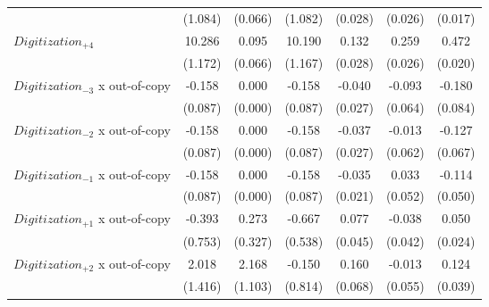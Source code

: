{\begin{tabular*}{\hsize}{@{\hskip\tabcolsep\extracolsep\fill}l*{6}{c}}
            &     (1.084)\sym{***}&     (0.066)         &     (1.082)\sym{***}&     (0.028)\sym{***}&     (0.026)\sym{***}&     (0.017)\sym{***}\\
\addlinespace
$Digitization_{+4}$&      10.286         &       0.095         &      10.190         &       0.132         &       0.259         &       0.472         \\
            &     (1.172)\sym{***}&     (0.066)         &     (1.167)\sym{***}&     (0.028)\sym{***}&     (0.026)\sym{***}&     (0.020)\sym{***}\\
\addlinespace
$Digitization_{-3}$ x out-of-copy&      -0.158         &       0.000         &      -0.158         &      -0.040         &      -0.093         &      -0.180         \\
            &     (0.087)\sym{*}  &     (0.000)         &     (0.087)\sym{*}  &     (0.027)\sym{+}  &     (0.064)\sym{+}  &     (0.084)\sym{**} \\
\addlinespace
$Digitization_{-2}$ x out-of-copy&      -0.158         &       0.000         &      -0.158         &      -0.037         &      -0.013         &      -0.127         \\
            &     (0.087)\sym{*}  &     (0.000)         &     (0.087)\sym{*}  &     (0.027)         &     (0.062)         &     (0.067)\sym{*}  \\
\addlinespace
$Digitization_{-1}$ x out-of-copy&      -0.158         &       0.000         &      -0.158         &      -0.035         &       0.033         &      -0.114         \\
            &     (0.087)\sym{*}  &     (0.000)         &     (0.087)\sym{*}  &     (0.021)\sym{*}  &     (0.052)         &     (0.050)\sym{**} \\
\addlinespace
$Digitization_{+1}$ x out-of-copy&      -0.393         &       0.273         &      -0.667         &       0.077         &      -0.038         &       0.050         \\
            &     (0.753)         &     (0.327)         &     (0.538)         &     (0.045)\sym{*}  &     (0.042)         &     (0.024)\sym{**} \\
\addlinespace
$Digitization_{+2}$ x out-of-copy&       2.018         &       2.168         &      -0.150         &       0.160         &      -0.013         &       0.124         \\
            &     (1.416)         &     (1.103)\sym{*}  &     (0.814)         &     (0.068)\sym{**} &     (0.055)         &     (0.039)\sym{***}\\

\end{tabular*}}
